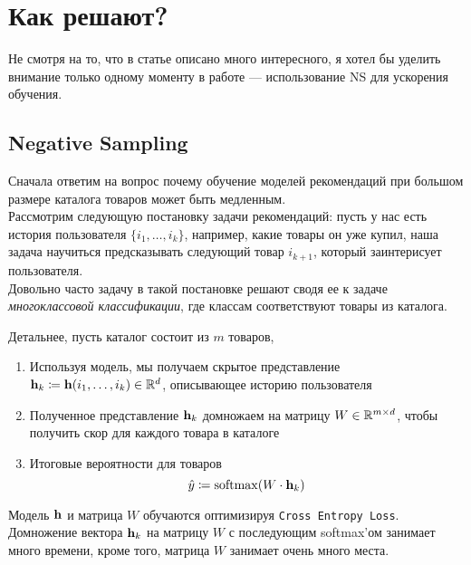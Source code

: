 \section*{Как решают?}

Не смотря на то, что в статье описано много интересного, я хотел бы уделить внимание только одному моменту в работе --- использование NS для ускорения обучения.

\subsection*{Negative Sampling}

Сначала ответим на вопрос почему обучение моделей рекомендаций при большом размере каталога товаров может быть медленным. \\

Рассмотрим следующую постановку задачи рекомендаций: пусть у нас есть история пользователя $ \{i_1, \ldots, i_k \} $, например, какие товары он уже купил, наша задача научиться предсказывать следующий товар $i_{k+1}$, который заинтерисует пользователя. \\

Довольно часто задачу в такой постановке решают сводя ее к задаче \textit{многоклассовой классификации}, где классам соответствуют товары из каталога. 

Детальнее, пусть каталог состоит из $m$ товаров,
\begin{enumerate}
    \item Используя модель, мы получаем скрытое представление ${\bf h}_k \coloneqq {\bf h}(i_1, \ldots, i_k) \in \mathbb{R}^{d} $, описывающее историю пользователя
    \item Полученное представление ${\bf h}_k$ домножаем на матрицу $W \in \mathbb{R}^{m \times d}$, чтобы получить скор для каждого товара в каталоге
    \item Итоговые вероятности для товаров 
        \begin{equation*}
            \hat{y} \coloneqq \operatorname*{softmax} (W \cdot {\bf h}_k)
        \end{equation*}
\end{enumerate}

Модель ${\bf h}$ и матрица $W$ обучаются оптимизируя \texttt{Cross Entropy Loss}. \\

Домножение вектора ${\bf h}_k$ на матрицу $W$ с последующим softmax'ом занимает много времени, кроме того, матрица $W$ занимает очень много места. \\

